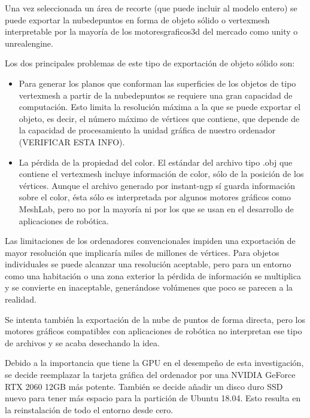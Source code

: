 \documentclass[a4paper, 12pt, spanish, twoside]{article}
\begin{document}

Una vez seleccionada un área de recorte (que puede incluir al modelo entero) se puede exportar la \gls{nubedepuntos} en forma de objeto sólido o \gls{vertexmesh} interpretable por la mayoría de los \gls{motoresgraficos3d} del mercado como \gls{unity} o \gls{unrealengine}. 

Los dos principales problemas de este tipo de exportación de objeto sólido son: 

\begin{itemize} 
\item Para generar los planos que conforman las superficies de los objetos de tipo \gls{vertexmesh} a partir de la \gls{nubedepuntos}  se requiere una gran capacidad de computación. Esto limita la resolución máxima a la que se puede exportar el objeto, es decir, el número máximo de vértices que contiene, que depende de la capacidad de procesamiento la unidad gráfica de nuestro ordenador (VERIFICAR ESTA INFO). 

\item La pérdida de la propiedad del color. El estándar del archivo tipo .obj que contiene el \gls{vertexmesh} incluye información de color, sólo de la posición de los vértices. Aunque el archivo generado por instant-ngp sí guarda información sobre el color, ésta sólo es interpretada por algunos motores gráficos como MeshLab, pero no por la mayoría ni por los que se usan en el desarrollo de aplicaciones de robótica. 
\end{itemize} 

Las limitaciones de los ordenadores convencionales impiden una exportación de mayor resolución que implicaría miles de millones de vértices. Para objetos individuales se puede alcanzar una resolución aceptable, pero para un entorno como una habitación o una zona exterior la pérdida de información se multiplica y se convierte en inaceptable, generándose volúmenes que poco se parecen a la realidad. 



Se intenta también la exportación de la nube de puntos de forma directa, pero los motores gráficos compatibles con aplicaciones de robótica no interpretan ese tipo de archivos y se acaba desechando la idea.

Debido a la importancia que tiene la GPU en el desempeño de esta investigación, se decide reemplazar la tarjeta gráfica del ordenador por una NVIDIA GeForce RTX 2060 12GB más potente. También se decide añadir un disco duro SSD nuevo para tener más espacio para la partición de Ubuntu 18.04. Esto resulta en la reinstalación de todo el entorno desde cero.
\end{document}
